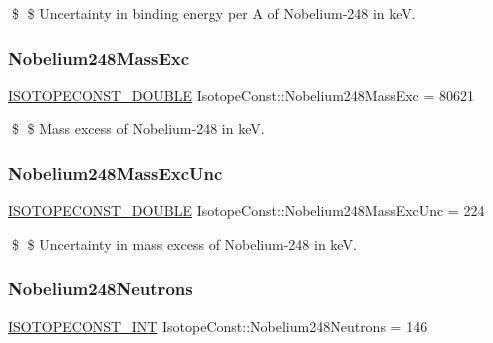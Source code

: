 \$ \$ Uncertainty in binding energy per A of Nobelium-\/248 in keV. \mbox{\label{group___isotope_const-_nobelium-_no248_ga3e0c8ac09707751b57f30afe95bb0cf0}} 
\subsubsection{\texorpdfstring{Nobelium248\+Mass\+Exc}{Nobelium248MassExc}}
{\footnotesize\ttfamily \mbox{\hyperlink{group___isotope_const-_macros_ga8f45a7272ce02c0b4c65c44636ed719a}{I\+S\+O\+T\+O\+P\+E\+C\+O\+N\+S\+T\+\_\+\+D\+O\+U\+B\+LE}} Isotope\+Const\+::\+Nobelium248\+Mass\+Exc = 80621}

\$ \$ Mass excess of Nobelium-\/248 in keV. \mbox{\label{group___isotope_const-_nobelium-_no248_gaf731bc2fd3fb54b0d1ad5e1630527b0b}} 
\subsubsection{\texorpdfstring{Nobelium248\+Mass\+Exc\+Unc}{Nobelium248MassExcUnc}}
{\footnotesize\ttfamily \mbox{\hyperlink{group___isotope_const-_macros_ga8f45a7272ce02c0b4c65c44636ed719a}{I\+S\+O\+T\+O\+P\+E\+C\+O\+N\+S\+T\+\_\+\+D\+O\+U\+B\+LE}} Isotope\+Const\+::\+Nobelium248\+Mass\+Exc\+Unc = 224}

\$ \$ Uncertainty in mass excess of Nobelium-\/248 in keV. \mbox{\label{group___isotope_const-_nobelium-_no248_ga4e203faba8161ae12c82ca5a199f0616}} 
\subsubsection{\texorpdfstring{Nobelium248\+Neutrons}{Nobelium248Neutrons}}
{\footnotesize\ttfamily \mbox{\hyperlink{group___isotope_const-_macros_ga5f18360b3e99483a35c32d789e62621c}{I\+S\+O\+T\+O\+P\+E\+C\+O\+N\+S\+T\+\_\+\+I\+NT}} Isotope\+Const\+::\+Nobelium248\+Neutrons = 146}

